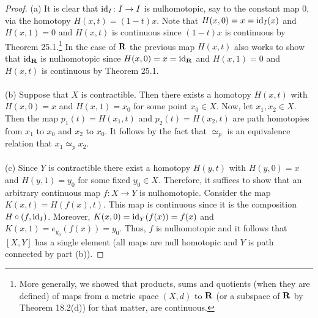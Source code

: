 \begin{proof}
(a) It is clear that $\operatorname{id}_I\colon I\to I$ is nulhomotopic, say to the
constant map $0$, via the homotopy $H(x,t)=(1-t)x$. Note that
$H(x,0)=x=\operatorname{id}_I(x)$ and $H(x,1)=0$ and $H(x,t)$ is continuous since
$(1-t)x$ is continuous by Theorem 25.1.\footnote{More generally, we showed
  that products, sums and quotients (when they are defined) of maps from a
  metric space $(X,d)$ to $\mathbf{R}$ (or a subspace of $\mathbf{R}$ by
  Theorem 18.2(d)) for that matter, are continuous.} In the case of $\mathbf{R}$
the previous map $H(x,t)$ also works to show that $\operatorname{id}_{\mathbf{R}}$ is
nulhomotopic since $H(x,0)=x=\operatorname{id}_{\mathbf{R}}$ and $H(x,1)=0$ and $H(x,t)$ is
continuous by Theorem 25.1.
\\\\
(b) Suppose that $X$ is contractible. Then there exists a homotopy $H(x,t)$
with $H(x,0)=x$ and $H(x,1)=x_0$ for some point $x_0\in X$. Now, let
$x_1,x_2\in X$. Then the map $p_1(t)=H(x_1,t)$ and $p_2(t)=H(x_2,t)$ are
path homotopies from $x_1$ to $x_0$ and $x_2$ to $x_0$. It follows by the
fact that $\simeq_p$ is an equivalence relation that $x_1\simeq_p x_2$.
\\\\
(c) Since $Y$ is contractible there exist a homotopy $H(y,t)$ with
$H(y,0)=x$ and $H(y,1)=y_0$ for some fixed $y_0\in X$. Therefore, it
suffices to show that an arbitrary continuous map $f\colon X\to Y$ is
nulhomotopic. Consider the map $K(x,t)=H(f(x),t)$. This map is continuous
since it is the composition $H\circ (f,\operatorname{id}_I)$. Moreover,
$K(x,0)=\operatorname{id}_Y(f(x))=f(x)$ and $K(x,1)=e_{y_0}(f(x))=y_0$. Thus, $f$ is
nulhomotopic and it follows that $[X,Y]$ has a single element (all maps are
null homotopic and $Y$ is path connected by part (b)).
\end{proof}

